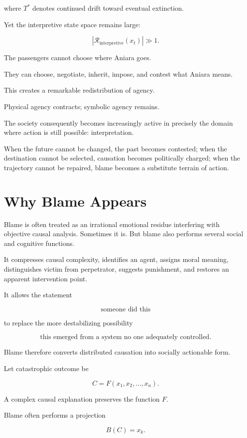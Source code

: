 \documentclass[11pt,oneside]{book}
\theoremstyle{definition}
\theoremstyle{remark}
\newcommand{\R}{\mathcal{R}}
\begin{document}
where \(T^\ast\) denotes continued drift toward eventual extinction.

Yet the interpretive state space remains large:

\[
|\R_{\mathrm{interpretive}}(x_t)|\gg1.
\]

The passengers cannot choose where Aniara goes.

They can choose, negotiate, inherit, impose, and contest what Aniara means.

This creates a remarkable redistribution of agency.

Physical agency contracts; symbolic agency remains.

The society consequently becomes increasingly active in precisely the domain where action is still possible: interpretation.

When the future cannot be changed, the past becomes contested; when the destination cannot be selected, causation becomes politically charged; when the trajectory cannot be repaired, blame becomes a substitute terrain of action.

\section{Why Blame Appears}

Blame is often treated as an irrational emotional residue interfering with objective causal analysis. Sometimes it is. But blame also performs several social and cognitive functions.

It compresses causal complexity, identifies an agent, assigns moral meaning, distinguishes victim from perpetrator, suggests punishment, and restores an apparent intervention point.

It allows the statement

\[
\text{someone did this}
\]

to replace the more destabilizing possibility

\[
\text{this emerged from a system no one adequately controlled}.
\]

Blame therefore converts distributed causation into socially actionable form.

Let catastrophic outcome be

\[
C=F(x_1,x_2,\ldots,x_n).
\]

A complex causal explanation preserves the function \(F\).

Blame often performs a projection

\[
B(C)=x_k.
\]
\end{document}
